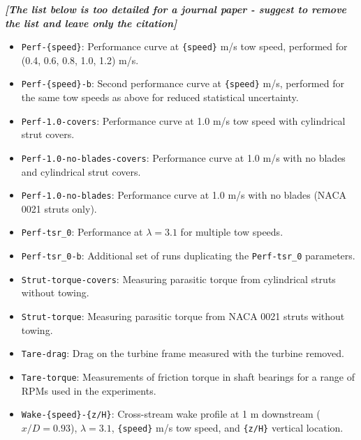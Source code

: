 \documentclass[10pt,letterpaper]{article}
\begin{document}
\textbf{\textit{[The list below is too detailed for a journal paper - suggest to remove the list and leave only the citation]}}
\begin{itemize}

    \item \texttt{Perf-\{speed\}}: Performance curve at \texttt{\{speed\}} m/s
    tow speed, performed for (0.4, 0.6, 0.8, 1.0, 1.2) m/s.

    \item \texttt{Perf-\{speed\}-b}: Second performance curve at
    \texttt{\{speed\}} m/s, performed for the same tow speeds as above for
    reduced statistical uncertainty.

    \item \texttt{Perf-1.0-covers}: Performance curve at 1.0 m/s tow speed with
    cylindrical strut covers.

    \item \texttt{Perf-1.0-no-blades-covers}: Performance curve at 1.0 m/s with
    no blades and cylindrical strut covers.

    \item \texttt{Perf-1.0-no-blades}: Performance curve at 1.0 m/s with no
    blades (NACA 0021 struts only).

    \item \texttt{Perf-tsr\_0}: Performance at $\lambda=3.1$ for multiple tow
    speeds.

    \item \texttt{Perf-tsr\_0-b}: Additional set of runs duplicating the
    \texttt{Perf-tsr\_0} parameters.

    \item \texttt{Strut-torque-covers}: Measuring parasitic torque from
    cylindrical struts without towing.

    \item \texttt{Strut-torque}: Measuring parasitic torque from
    NACA 0021 struts without towing.

    \item \texttt{Tare-drag}: Drag on the turbine frame measured with the turbine
    removed.

    \item \texttt{Tare-torque}: Measurements of friction torque in shaft
    bearings for a range of RPMs used in the experiments.

    \item \texttt{Wake-\{speed\}-\{z/H\}}: Cross-stream wake profile at 1 m
    downstream ($x/D=0.93$), $\lambda=3.1$, \texttt{\{speed\}} m/s tow speed,
    and \texttt{\{z/H\}} vertical location.
\end{itemize}
\end{document}
